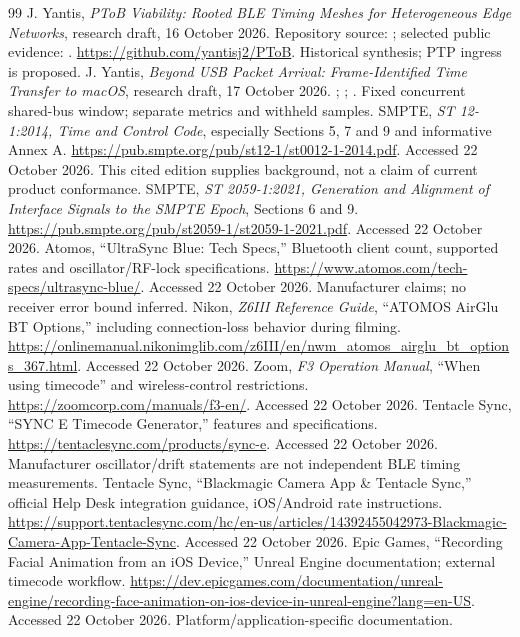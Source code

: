 \documentclass[11pt,letterpaper]{article}
\begin{document}
\begin{thebibliography}{99}\small
{} J. Yantis, \emph{PToB Viability: Rooted BLE Timing Meshes for Heterogeneous Edge Networks}, research draft, 16 October 2026. Repository source: ; selected public evidence: . \url{https://github.com/yantisj2/PToB}. Historical synthesis; PTP ingress is proposed.
 J. Yantis, \emph{Beyond USB Packet Arrival: Frame-Identified Time Transfer to macOS}, research draft, 17 October 2026. ; ; . Fixed concurrent shared-bus window; separate metrics and withheld samples.
 SMPTE, \emph{ST 12-1:2014, Time and Control Code}, especially Sections 5, 7 and 9 and informative Annex A. \url{https://pub.smpte.org/pub/st12-1/st0012-1-2014.pdf}. Accessed 22 October 2026. This cited edition supplies background, not a claim of current product conformance.
 SMPTE, \emph{ST 2059-1:2021, Generation and Alignment of Interface Signals to the SMPTE Epoch}, Sections 6 and 9. \url{https://pub.smpte.org/pub/st2059-1/st2059-1-2021.pdf}. Accessed 22 October 2026.
 Atomos, ``UltraSync Blue: Tech Specs,'' Bluetooth client count, supported rates and oscillator/RF-lock specifications. \url{https://www.atomos.com/tech-specs/ultrasync-blue/}. Accessed 22 October 2026. Manufacturer claims; no receiver error bound inferred.
 Nikon, \emph{Z6III Reference Guide}, ``ATOMOS AirGlu BT Options,'' including connection-loss behavior during filming. \url{https://onlinemanual.nikonimglib.com/z6III/en/nwm_atomos_airglu_bt_options_367.html}. Accessed 22 October 2026.
 Zoom, \emph{F3 Operation Manual}, ``When using timecode'' and wireless-control restrictions. \url{https://zoomcorp.com/manuals/f3-en/}. Accessed 22 October 2026.
 Tentacle Sync, ``SYNC E Timecode Generator,'' features and specifications. \url{https://tentaclesync.com/products/sync-e}. Accessed 22 October 2026. Manufacturer oscillator/drift statements are not independent BLE timing measurements.
 Tentacle Sync, ``Blackmagic Camera App \& Tentacle Sync,'' official Help Desk integration guidance, iOS/Android rate instructions. \url{https://support.tentaclesync.com/hc/en-us/articles/14392455042973-Blackmagic-Camera-App-Tentacle-Sync}. Accessed 22 October 2026.
 Epic Games, ``Recording Facial Animation from an iOS Device,'' Unreal Engine documentation; external timecode workflow. \url{https://dev.epicgames.com/documentation/unreal-engine/recording-face-animation-on-ios-device-in-unreal-engine?lang=en-US}. Accessed 22 October 2026. Platform/application-specific documentation.

\end{thebibliography}
\end{document}
